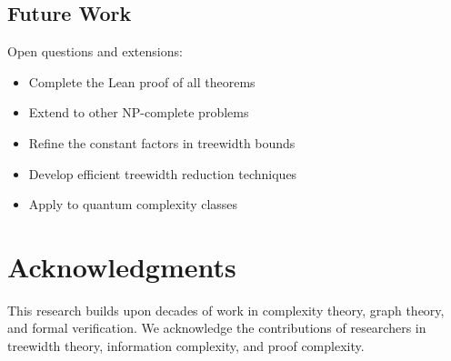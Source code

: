 \documentclass[11pt]{article}
\begin{document}
\subsection{Future Work}

Open questions and extensions:
\begin{itemize}
\item Complete the Lean proof of all theorems
\item Extend to other NP-complete problems
\item Refine the constant factors in treewidth bounds
\item Develop efficient treewidth reduction techniques
\item Apply to quantum complexity classes
\end{itemize}

\section*{Acknowledgments}

This research builds upon decades of work in complexity theory, graph theory, and formal verification. We acknowledge the contributions of researchers in treewidth theory, information complexity, and proof complexity.

\printbibliography
\end{document}
